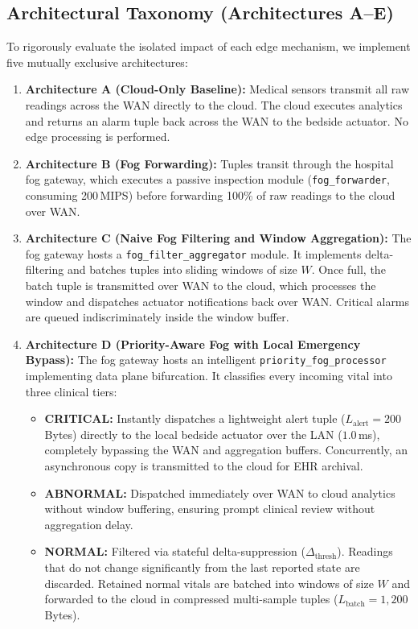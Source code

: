 \documentclass[conference]{IEEEtran}
\begin{document}
\subsection{Architectural Taxonomy (Architectures A--E)}
To rigorously evaluate the isolated impact of each edge mechanism, we implement five mutually exclusive architectures:
\begin{enumerate}
    \item \textbf{Architecture A (Cloud-Only Baseline):} Medical sensors transmit all raw readings across the WAN directly to the cloud. The cloud executes analytics and returns an alarm tuple back across the WAN to the bedside actuator. No edge processing is performed.
    \item \textbf{Architecture B (Fog Forwarding):} Tuples transit through the hospital fog gateway, which executes a passive inspection module (\texttt{fog\_forwarder}, consuming 200\,MIPS) before forwarding 100\% of raw readings to the cloud over WAN.
    \item \textbf{Architecture C (Naive Fog Filtering and Window Aggregation):} The fog gateway hosts a \texttt{fog\_filter\_aggregator} module. It implements delta-filtering and batches tuples into sliding windows of size $W$. Once full, the batch tuple is transmitted over WAN to the cloud, which processes the window and dispatches actuator notifications back over WAN. Critical alarms are queued indiscriminately inside the window buffer.
    \item \textbf{Architecture D (Priority-Aware Fog with Local Emergency Bypass):} The fog gateway hosts an intelligent \texttt{priority\_fog\_processor} implementing data plane bifurcation. It classifies every incoming vital into three clinical tiers:
    \begin{itemize}
        \item \textbf{CRITICAL:} Instantly dispatches a lightweight alert tuple ($L_{\text{alert}} = 200$\,Bytes) directly to the local bedside actuator over the LAN ($1.0$\,ms), completely bypassing the WAN and aggregation buffers. Concurrently, an asynchronous copy is transmitted to the cloud for EHR archival.
        \item \textbf{ABNORMAL:} Dispatched immediately over WAN to cloud analytics without window buffering, ensuring prompt clinical review without aggregation delay.
        \item \textbf{NORMAL:} Filtered via stateful delta-suppression ($\Delta_{\text{thresh}}$). Readings that do not change significantly from the last reported state are discarded. Retained normal vitals are batched into windows of size $W$ and forwarded to the cloud in compressed multi-sample tuples ($L_{\text{batch}} = 1{,}200$\,Bytes).

\end{itemize}
\end{enumerate}
\end{document}
